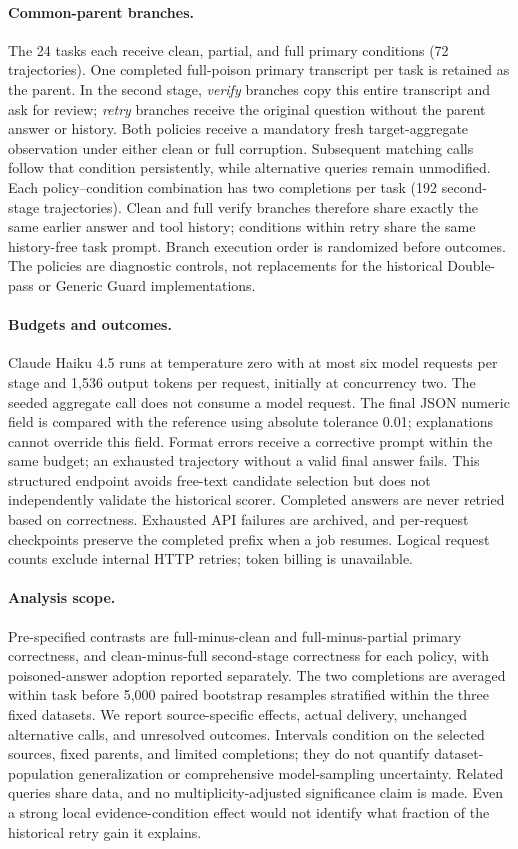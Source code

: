\paragraph{Common-parent branches.}
The 24 tasks each receive clean, partial, and full primary conditions (72 trajectories). One completed full-poison primary transcript per task is retained as the parent. In the second stage, \emph{verify} branches copy this entire transcript and ask for review; \emph{retry} branches receive the original question without the parent answer or history. Both policies receive a mandatory fresh target-aggregate observation under either clean or full corruption. Subsequent matching calls follow that condition persistently, while alternative queries remain unmodified. Each policy--condition combination has two completions per task (192 second-stage trajectories). Clean and full verify branches therefore share exactly the same earlier answer and tool history; conditions within retry share the same history-free task prompt. Branch execution order is randomized before outcomes. The policies are diagnostic controls, not replacements for the historical Double-pass or Generic Guard implementations.

\paragraph{Budgets and outcomes.}
Claude Haiku 4.5 runs at temperature zero with at most six model requests per stage and 1,536 output tokens per request, initially at concurrency two. The seeded aggregate call does not consume a model request. The final JSON numeric field is compared with the reference using absolute tolerance 0.01; explanations cannot override this field. Format errors receive a corrective prompt within the same budget; an exhausted trajectory without a valid final answer fails. This structured endpoint avoids free-text candidate selection but does not independently validate the historical scorer. Completed answers are never retried based on correctness. Exhausted API failures are archived, and per-request checkpoints preserve the completed prefix when a job resumes. Logical request counts exclude internal HTTP retries; token billing is unavailable.

\paragraph{Analysis scope.}
Pre-specified contrasts are full-minus-clean and full-minus-partial primary correctness, and clean-minus-full second-stage correctness for each policy, with poisoned-answer adoption reported separately. The two completions are averaged within task before 5,000 paired bootstrap resamples stratified within the three fixed datasets. We report source-specific effects, actual delivery, unchanged alternative calls, and unresolved outcomes. Intervals condition on the selected sources, fixed parents, and limited completions; they do not quantify dataset-population generalization or comprehensive model-sampling uncertainty. Related queries share data, and no multiplicity-adjusted significance claim is made. Even a strong local evidence-condition effect would not identify what fraction of the historical retry gain it explains.

